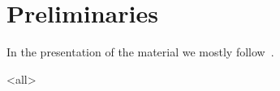 \section{Preliminaries}

\mode*
In the presentation of the material we mostly
follow~\cite{Axler2020,Simon2015,Rodriguez2021}.

\mode<all>




% 
